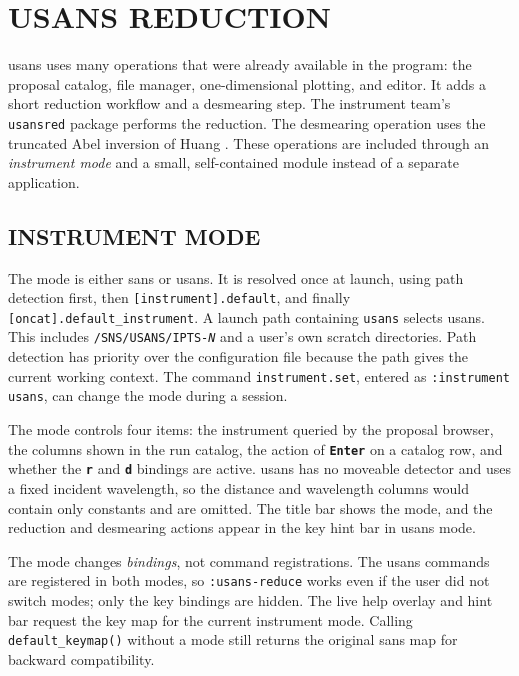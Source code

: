 \documentclass[tm]{ornltm}
\newcommand{\key}[1]{\textbf{\texttt{#1}}}
\begin{document}
\section{USANS REDUCTION}
\label{sec:usans}

\Ac{usans} uses many operations that were already available in the program: the
proposal catalog, file manager, one-dimensional plotting, and editor. It adds a
short reduction workflow and a desmearing step. The instrument team's
\texttt{usansred} package performs the reduction. The desmearing operation uses
the truncated Abel inversion of Huang \autocite{huang2026abel}. These operations
are included through an \emph{instrument mode} and a small, self-contained
module instead of a separate application.

\subsection{INSTRUMENT MODE}

The mode is either \ac{sans} or \ac{usans}. It is resolved once at launch, using
path detection first, then \texttt{[instrument].default}, and finally
\texttt{[oncat].default\_instrument}. A launch path containing
\texttt{usans} selects \ac{usans}. This includes
\texttt{/SNS/USANS/IPTS-\textit{N}} and a user's own scratch directories. Path
detection has priority over the configuration file because the path gives the
current working context. The command \texttt{instrument.set}, entered as
\texttt{:instrument usans}, can change the mode during a session.

The mode controls four items: the instrument queried by the proposal browser,
the columns shown in the run catalog, the action of \key{Enter} on a catalog
row, and whether the \key{r} and \key{d} bindings are active. \Ac{usans} has no moveable
detector and uses a fixed incident wavelength, so the distance and wavelength
columns would contain only constants and are omitted. The title bar shows the
mode, and the reduction and desmearing actions appear in the key hint bar in
\ac{usans} mode.

The mode changes \emph{bindings}, not command registrations. The \ac{usans}
commands are registered in both modes, so \texttt{:usans-reduce} works even if
the user did not switch modes; only the key bindings are hidden. The live help
overlay and hint bar request the key map for the current instrument mode.
Calling \texttt{default\_keymap()} without a mode still returns the original
\ac{sans} map for backward compatibility.
\end{document}
